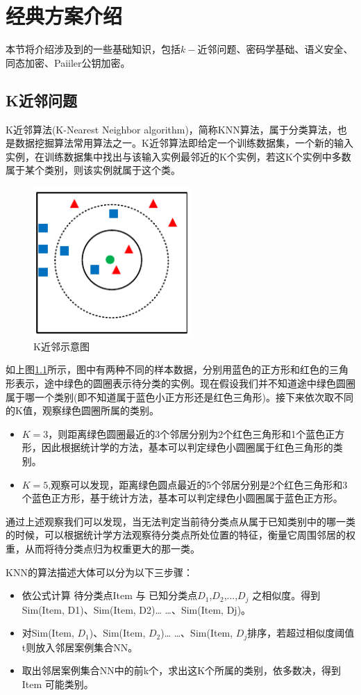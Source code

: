\chapter{经典方案介绍}
\vspace{-0.2cm}
本节将介绍涉及到的一些基础知识，包括$k-$近邻问题、密码学基础、语义安全、同态加密、Paiiler公钥加密。
\section{K近邻问题}
K近邻算法(K-Nearest Neighbor algorithm)，简称KNN算法，属于分类算法，也是数据挖掘算法常用算法之一。K近邻算法即给定一个训练数据集，一个新的输入实例，在训练数据集中找出与该输入实例最邻近的K个实例，若这K个实例中多数属于某个类别，则该实例就属于这个类。
\begin{figure}[H]
\centering
\includegraphics[width=6cm]{fig/KNN.pdf}
\caption{K近邻示意图} %
\label{fig:KNN_pdf}
\end{figure}
如上图\ref{fig:KNN_pdf}所示，图中有两种不同的样本数据，分别用蓝色的正方形和红色的三角形表示，途中绿色的圆圈表示待分类的实例。现在假设我们并不知道途中绿色圆圈属于哪一个类别(即不知道属于蓝色小正方形还是红色三角形)。接下来依次取不同的K值，观察绿色圆圈所属的类别。
\begin{itemize}
\item $K=3$，则距离绿色圆圈最近的3个邻居分别为2个红色三角形和1个蓝色正方形，因此根据统计学的方法，基本可以判定绿色小圆圈属于红色三角形的类别。
\item $K=5$,观察可以发现，距离绿色圆点最近的5个邻居分别是2个红色三角形和3个蓝色正方形，基于统计方法，基本可以判定绿色小圆圈属于蓝色正方形。
\end{itemize}
通过上述观察我们可以发现，当无法判定当前待分类点从属于已知类别中的哪一类的时候，可以根据统计学方法观察待分类点所处位置的特征，衡量它周围邻居的权重，从而将待分类点归为权重更大的那一类。

KNN的算法描述大体可以分为以下三步骤：
\begin{itemize}
\item 依公式计算 待分类点Item 与 已知分类点$D_1$,$D_2$,...,$D_j$ 之相似度。得到Sim(Item, D1)、Sim(Item, D2)… …、Sim(Item, Dj)。
\item 对Sim(Item, $D_1$)、Sim(Item, $D_2$)… …、Sim(Item, $D_j$排序，若超过相似度阈值t则放入邻居案例集合NN。
\item 取出邻居案例集合NN中的前k个，求出这K个所属的类别，依多数决，得到Item 可能类别。
\end{itemize}


